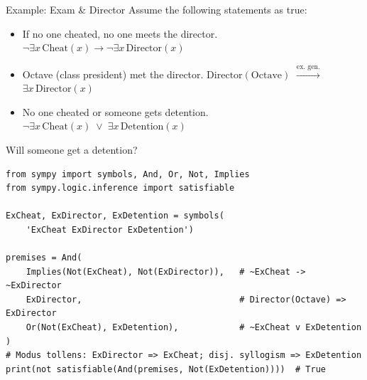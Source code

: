 \documentclass[aspectratio=169]{beamer}
\begin{document}
\begin{frame}[fragile]{Example: Exam \& Director}
  Assume the following statements as true:
  \begin{itemize}
    \item If no one cheated, no one meets the director. \quad
          $\neg\exists x\,\mathrm{Cheat}(x) \to \neg\exists x\,\mathrm{Director}(x)$
    \item Octave (class president) met the director. \quad
          $\mathrm{Director(Octave)}$ \quad
          $\xrightarrow{\text{ex. gen.}}$ \; $\exists x\,\mathrm{Director}(x)$
    \item No one cheated or someone gets detention. \quad
          $\neg\exists x\,\mathrm{Cheat}(x) \;\vee\; \exists x\,\mathrm{Detention}(x)$
  \end{itemize}

  Will someone get a detention?

  \begin{lstlisting}[style=python]
from sympy import symbols, And, Or, Not, Implies
from sympy.logic.inference import satisfiable

ExCheat, ExDirector, ExDetention = symbols(
    'ExCheat ExDirector ExDetention')

premises = And(
    Implies(Not(ExCheat), Not(ExDirector)),   # ~ExCheat -> ~ExDirector
    ExDirector,                               # Director(Octave) => ExDirector
    Or(Not(ExCheat), ExDetention),            # ~ExCheat v ExDetention
)
# Modus tollens: ExDirector => ExCheat; disj. syllogism => ExDetention
print(not satisfiable(And(premises, Not(ExDetention))))  # True
  \end{lstlisting}
\end{frame}
\end{document}
